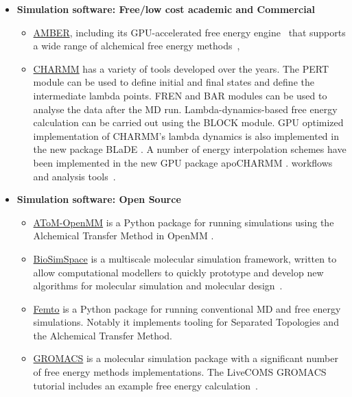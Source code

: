 \documentclass[9pt,bestpractices]{livecoms}
\begin{document}
\begin{itemize}
\item [] \textbf{Simulation software: Free/low cost academic and Commercial}
	\begin{itemize}
    \item \href{https://ambermd.org/}{AMBER}, including its GPU-accelerated free energy engine~\cite{Lee_JChemTheoryComput_2017_v13_p3077,Giese_JChemTheoryComput_2018_v14_p1564,Lee_JChemInfModel_2018_v58_p2043} that supports a wide range of alchemical free energy methods~\cite{Tsai_JChemTheoryComput_2023_v19_p640,lee2023aces,Zhang_JChemTheoryComput_2024_v20_p3935},
	\item \href{https://www.charmm.org/}{CHARMM} has a variety of tools developed over the years. The PERT module can be used to define initial and final states and define the intermediate lambda points. FREN and BAR modules can be used to analyse the data after the MD run. Lambda-dynamics-based free energy calculation can be carried out using the BLOCK module. GPU optimized implementation of CHARMM's lambda dynamics is also implemented in the new package BLaDE \cite{hayes2021blade}. A number of energy interpolation schemes have been implemented in the new GPU package apoCHARMM \cite{prasad2025apocharmm}.      workflows~\cite{Ganguly_JChemInfModel_2022_v62_p6069} and analysis tools~\cite{Giese_JChemInfModel_2025_v65_p5273,Case_JChemInfModel_2023_v63_p6183}. 
	\end{itemize}
\item [] \textbf{Simulation software: Open Source}
	\begin{itemize}
    \item \href{https://github.com/Gallicchio-Lab/AToM-OpenMM}{AToM-OpenMM} is a Python package for running simulations using the Alchemical Transfer Method in OpenMM \cite{azimi2022relative, wu2021alchemical,gallicchio2008,gallicchio2025mutants}.    
    \item \href{https://biosimspace.org/}{BioSimSpace} is a multiscale molecular simulation framework, written to allow computational modellers to quickly prototype and develop new algorithms for molecular simulation and molecular design~\cite{hedges2019biosimspace, hedges2023suite}.
\item \href{https://github.com/Psivant/femto/tree/main}{Femto} is a Python package for running conventional MD and free energy simulations. Notably it implements tooling for Separated Topologies\cite{baumann2023broadening} and the Alchemical Transfer Method\cite{azimi2022relative,wu2021alchemical,gallicchio2008,gallicchio2025mutants}.
    \item 	\href{http://www.gromacs.org/}{GROMACS} is a molecular simulation package with a significant number of free energy methods implementations. The LiveCOMS GROMACS tutorial includes an example free energy calculation~\cite{lemkul2018From}.

\end{itemize}
\end{itemize}
\end{document}
